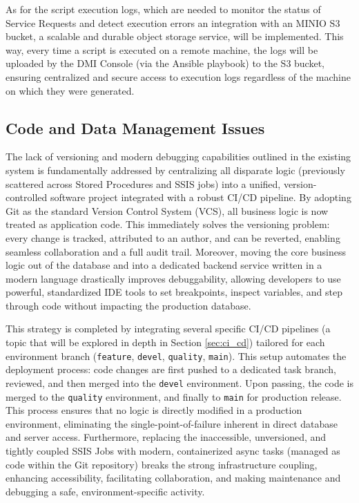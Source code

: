 As for the script execution logs, which are needed to monitor the status of Service Requests and detect execution errors an integration with an MINIO S3 bucket, a scalable and durable object storage service, will be implemented. This way, every time a script is executed on a remote machine, the logs will be uploaded by the DMI Console (via the Ansible playbook) to the S3 bucket, ensuring centralized and secure access to execution logs regardless of the machine on which they were generated.

\subsection{Code and Data Management Issues}
The lack of versioning and modern debugging capabilities outlined in the existing system is fundamentally addressed by centralizing all disparate logic (previously scattered across Stored Procedures and SSIS jobs) into a unified, version-controlled software project integrated with a robust CI/CD pipeline. By adopting Git as the standard Version Control System (VCS), all business logic is now treated as application code. This immediately solves the versioning problem: every change is tracked, attributed to an author, and can be reverted, enabling seamless collaboration and a full audit trail. Moreover, moving the core business logic out of the database and into a dedicated backend service written in a modern language drastically improves debuggability, allowing developers to use powerful, standardized IDE tools to set breakpoints, inspect variables, and step through code without impacting the production database.

This strategy is completed by integrating several specific CI/CD pipelines (a topic that will be explored in depth in Section \ref{sec:ci_cd}) tailored for each environment branch (\texttt{feature}, \texttt{devel}, \texttt{quality}, \texttt{main}). This setup automates the deployment process: code changes are first pushed to a dedicated task branch, reviewed, and then merged into the \texttt{devel} environment. Upon passing, the code is merged to the \texttt{quality} environment, and finally to \texttt{main} for production release. This process ensures that no logic is directly modified in a production environment, eliminating the single-point-of-failure inherent in direct database and server access. Furthermore, replacing the inaccessible, unversioned, and tightly coupled SSIS Jobs with modern, containerized async tasks (managed as code within the Git repository) breaks the strong infrastructure coupling, enhancing accessibility, facilitating collaboration, and making maintenance and debugging a safe, environment-specific activity.

